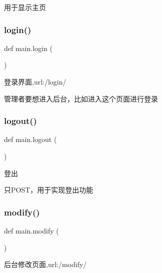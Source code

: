用于显示主页 \mbox{\label{group___xE8_xB7_xAF_xE7_x94_xB1_xE5_x87_xBD_xE6_x95_xB0_ga4a5118733a16e40bc747937152312ab0}} 
\subsubsection{\texorpdfstring{login()}{login()}}
{\footnotesize\ttfamily def main.\+login (\begin{DoxyParamCaption}{ }\end{DoxyParamCaption})}



登录界面,url\+:\textquotesingle{}/login/\textquotesingle{} 

管理者要想进入后台，比如进入这个页面进行登录 \mbox{\label{group___xE8_xB7_xAF_xE7_x94_xB1_xE5_x87_xBD_xE6_x95_xB0_ga6065500a38cb05f19a9613bdc7ac05f1}} 
\subsubsection{\texorpdfstring{logout()}{logout()}}
{\footnotesize\ttfamily def main.\+logout (\begin{DoxyParamCaption}{ }\end{DoxyParamCaption})}



登出 

只\+P\+O\+S\+T，用于实现登出功能 \mbox{\label{group___xE8_xB7_xAF_xE7_x94_xB1_xE5_x87_xBD_xE6_x95_xB0_gac7ef9122c03a3279b6d1d904f4a16150}} 
\subsubsection{\texorpdfstring{modify()}{modify()}}
{\footnotesize\ttfamily def main.\+modify (\begin{DoxyParamCaption}{ }\end{DoxyParamCaption})}



后台修改页面,url\+:\textquotesingle{}/modify/\textquotesingle{} 

